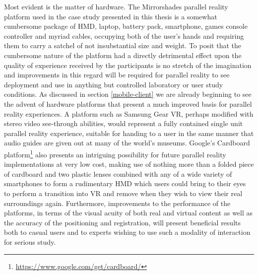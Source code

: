 Most evident is the matter of hardware. The Mirrorshades parallel reality platform used in the case study presented in this thesis is a somewhat cumbersome package of HMD, laptop, battery pack, smartphone, games console controller and myriad cables, occupying both of the user's hands and requiring them to carry a satchel of not insubstantial size and weight. To posit that the cumbersome nature of the platform had a directly detrimental effect upon the quality of experience received by the participants is no stretch of the imagination and improvements in this regard will be required for parallel reality to see deployment and use in anything but controlled laboratory or user study conditions. As discussed in section \ref{mobile-client} we are already beginning to see the advent of hardware platforms that present a much improved basis for parallel reality experiences. A platform such as Samsung Gear VR, perhaps modified with stereo video see-through abilities, would represent a fully contained single unit parallel reality experience, suitable for handing to a user in the same manner that audio guides are given out at many of the world's museums. Google's Cardboard platform\footnote{\url{https://www.google.com/get/cardboard/}} also presents an intriguing possibility for future parallel reality implementations at very low cost, making use of nothing more than a folded piece of cardboard and two plastic lenses combined with any of a wide variety of smartphones to form a rudimentary HMD which users could bring to their eyes to perform a transition into VR and remove when they wish to view their real surroundings again. Furthermore, improvements to the performance of the platforms, in terms of the visual acuity of both real and virtual content as well as the accuracy of the positioning and registration, will present beneficial results both to casual users and to experts wishing to use such a modality of interaction for serious study. 


